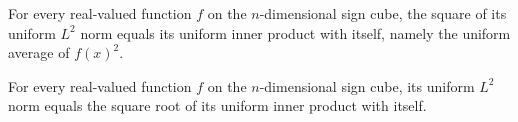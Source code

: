 \begin{theorem}
\label{FABL.uniformLpNorm_two_sq_eq_uniformInner}
\leanok
{}
For every real-valued function $f$ on the $n$-dimensional sign cube, the square of its
uniform $L^2$ norm equals its uniform inner product with itself, namely the uniform
average of $f(x)^2$.
\end{theorem}

\begin{theorem}
\label{FABL.uniformLpNorm_two_eq_sqrt_uniformInner}
\leanok
{}
For every real-valued function $f$ on the $n$-dimensional sign cube, its uniform $L^2$
norm equals the square root of its uniform inner product with itself.
\end{theorem}

